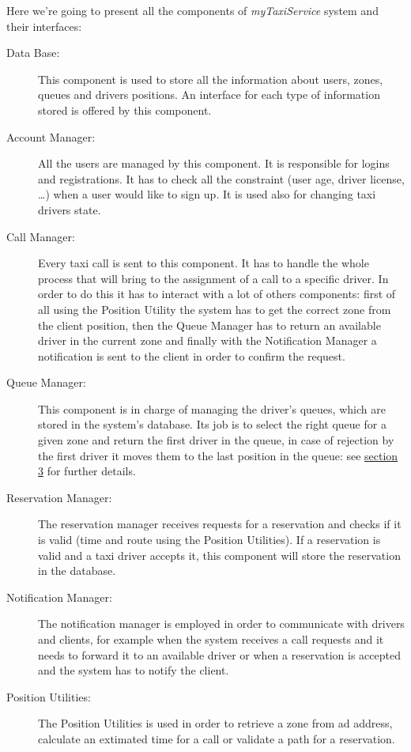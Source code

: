 \documentclass[a4paper]{article}
\begin{document}
Here we're going to present all the components of \emph{myTaxiService} system and their interfaces:

\begin{description}
\item[Data Base:] This component is used to store all the information about users, zones, queues and  drivers positions. An interface for each type of information stored is offered by this component.
\item[Account Manager:] All the users are managed by this component. It is responsible for logins and registrations. It has to check all the constraint (user age, driver license, \ldots) when a user would like to sign up. It is used also for changing taxi drivers state.
\item[Call Manager:] Every taxi call is sent to this component. It has to handle the whole process that will bring to the assignment of a call to a specific driver. In order to do this it has to interact with a lot of others components: first of all using the Position Utility the system has to get the correct zone from the client position, then the Queue Manager has to return an available driver in the current zone and finally with the Notification Manager a notification is sent to the client in order to confirm the request.
\item[Queue Manager:] This component is in charge of managing the driver's queues, which are stored in the system's database. Its job is to select the right queue for a given zone and return the first driver in the queue, in case of rejection by the first driver it moves them to the last position in the queue: see \hyperref[sec:sec3]{\underline{section 3}}  for further details.
\item[Reservation Manager:] The reservation manager receives requests for a reservation and checks if it is valid (time and route using the Position Utilities). If a reservation is valid and a taxi driver accepts it, this component will store the reservation in the database.
\item[Notification Manager:] The notification manager is employed in order to communicate with drivers and clients, for example when the system receives a call requests and it needs to forward it to an available driver or when a reservation is accepted and the system has to notify the client.
\item[Position Utilities:] The Position Utilities is used in order to retrieve a zone from ad address, calculate an extimated time for a call or validate a path for a reservation.
\end{description}
\end{document}
